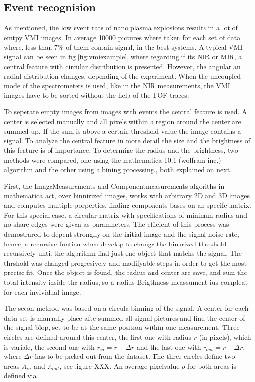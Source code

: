 \subsection{Event recognision}

As mentioned, the low event rate of nano plasma explosions results in a lot of emtpy VMI images. In average 10000 pictures where taken for each set of data where, less than $7\%$ of them contain signal, in the best  systems. A typical VMI signal can be seen in fig \ref{fig:vmiexample}, where regarding if its NIR or MIR, a central feature with circular distribution is presented. However, the angular an radial distribution changes, depending of the experiment. When the uncoupled mode of the spectrometers is used, like in the NIR measurements, the VMI images have to be sorted without the help of the TOF traces.

To seperate empty images from images with events the central feature is used. A center is selected manually and all pixels within a region around the center are summed up. If the sum is above a certain threshold value the image contains a signal. To analyze the central feature in more detail the size and the brightness of this feature is of importance. To determine the radius and the brightness, two methods were compared, one using the mathematica 10.1 (wolfram inc.) algorithm and the other using a bining processing., both explained on next.

First, the ImageMeasurements and Componentmeasurements  algoriths in mathematica act, over binnirized images, works with arbitrary 2D and 3D images and computes  multiple porperties, finding components bases on an specifc matrix. For this special case, a circular matrix with specifications of minimun radius and  no share edges were given as paramneters. The efficient of this process was demostrared to depent stronglly on the initial image and the signal-noise rate, hence, a recursive funtion when develop to change the binarized threshold  recursively until the algprithm find just one object that matchs the signal. The thrshold was changed progresively and modifyable steps in order to get the most precise fit. Once the object is found, the radius and center are save, and sum the total intensity inside the radius, so a radius-Brigthness  meassument ius compleat for each invividual image.

The secon method was based on a circula binning of the signal. A center for each data set is manually place afte summed all signal pictures and find the center of the signal blop, set to be at the same position within one measurement. Three circles are defined around this center, the first one with radius $r$ (in pixels), which is variale, the second one with $r_{in} = r-\Delta r$ and the last one with $r_{out} = r + \Delta r$, where $\Delta r$ has to be picked out from the dataset. The three circles define two areas $A_{in}$ and $A_{out}$, see figure XXX. An average pixelvalue $\rho$ for both areas is defined via

